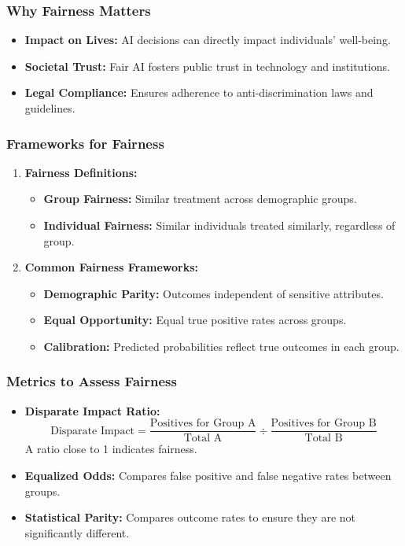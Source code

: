 \documentclass[aspectratio=169]{beamer}
\begin{document}
\begin{frame}[fragile]
    \frametitle{Why Fairness Matters}
    \begin{itemize}
        \item \textbf{Impact on Lives:} 
            AI decisions can directly impact individuals' well-being.
        \item \textbf{Societal Trust:} 
            Fair AI fosters public trust in technology and institutions.
        \item \textbf{Legal Compliance:} 
            Ensures adherence to anti-discrimination laws and guidelines.
    \end{itemize}
\end{frame}

\begin{frame}[fragile]
    \frametitle{Frameworks for Fairness}
    \begin{enumerate}
        \item \textbf{Fairness Definitions:}
            \begin{itemize}
                \item \textbf{Group Fairness:} Similar treatment across demographic groups.
                \item \textbf{Individual Fairness:} Similar individuals treated similarly, regardless of group.
            \end{itemize}
        \item \textbf{Common Fairness Frameworks:}
            \begin{itemize}
                \item \textbf{Demographic Parity:} Outcomes independent of sensitive attributes.
                \item \textbf{Equal Opportunity:} Equal true positive rates across groups.
                \item \textbf{Calibration:} Predicted probabilities reflect true outcomes in each group.
            \end{itemize}
    \end{enumerate}
\end{frame}

\begin{frame}[fragile]
    \frametitle{Metrics to Assess Fairness}
    \begin{itemize}
        \item \textbf{Disparate Impact Ratio:} 
            \[ \text{Disparate Impact} = \frac{\text{Positives for Group A}}{\text{Total A}} \div \frac{\text{Positives for Group B}}{\text{Total B}} \]
            A ratio close to 1 indicates fairness.
        \item \textbf{Equalized Odds:} Compares false positive and false negative rates between groups.
        \item \textbf{Statistical Parity:} Compares outcome rates to ensure they are not significantly different.
    \end{itemize}
\end{frame}
\end{document}
